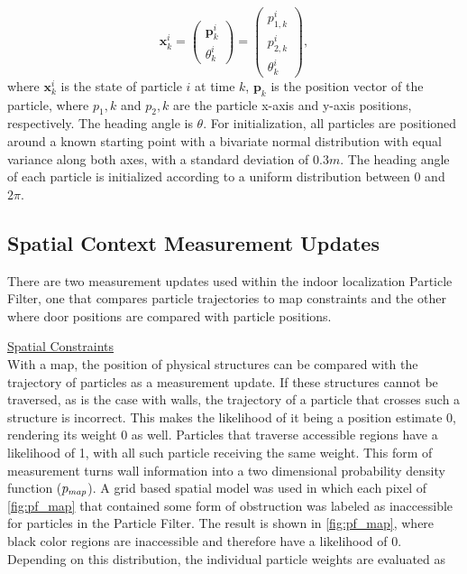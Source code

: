 \begin{equation}
\mathbf{x}_k^i = \left(\begin{array}{l}
	\mathbf{p}_{k}^i   \\
	\theta_k^i
\end{array}\right) = \left(\begin{array}{l}
p_{1,k}^i   \\
p_{2,k}^i  \\
\theta_k^i
\end{array}\right), 
\label{eq:pf_state}
\end{equation}
where $\mathbf{x}^i_k$ is the state of particle $i$ at time $k$, $\mathbf{p}_k$ is the position vector of the particle, where $p_1,k $ and $p_2,k$ are the particle x-axis and y-axis positions, respectively. The heading angle is  $\theta$. For initialization,  all particles are positioned around a known starting point with a bivariate normal  distribution with equal variance along both axes, with a standard deviation of $ 0.3 m $. The heading angle of each particle is initialized according to a uniform distribution between 0 and $ 2\pi $. \par 

\subsection{Spatial Context Measurement Updates}
	There are two measurement updates used within the indoor localization Particle Filter, one that compares particle trajectories to map constraints and the other where door positions are compared with particle positions. \par 
	
	\underline{Spatial Constraints}\\
   With a map, the position of physical structures can be compared with the trajectory of particles as a measurement update. If these structures cannot be traversed, as is the case with walls, the trajectory of a particle that crosses such a structure is incorrect. This makes the likelihood of it being a position estimate 0, rendering its weight 0 as well. Particles that traverse accessible regions have a likelihood of 1, with all such particle receiving the same weight. This form of measurement turns wall information into a two dimensional probability density function ($p_{\scaleto{map}{4pt}}$). A grid based spatial model was used in which each pixel of \cref{fig:pf_map} that contained some form of obstruction was labeled as inaccessible for particles in the Particle Filter. The result is shown in \cref{fig:pf_map}, where black color regions are inaccessible and therefore have a likelihood of 0.\\
   Depending on this distribution, the individual particle weights are evaluated as 
   
